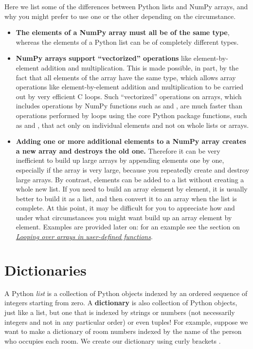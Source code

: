 \documentclass[letterpaper,10pt,english]{sphinxmanual}
\begin{document}
Here we list some of the differences between Python lists and NumPy arrays, and why you might prefer to use one or the other depending on the circumstance.
\begin{itemize}
\item {} 
\textbf{The elements of a NumPy array must all be of the same type}, whereas the elements of a Python list can be of completely different types.

\item {} 
\textbf{NumPy arrays support ``vectorized'' operations} like element-by-element addition and multiplication.  This is made possible, in part, by the fact that all elements of the array have the same type, which allows array operations like element-by-element addition and multiplication to be carried out by very efficient C loops.  Such ``vectorized'' operations on arrays, which includes operations by NumPy functions such as  and , are much faster than operations performed by loops using the core Python  package functions, such as  and , that act only on individual elements and not on whole lists or arrays.

\item {} 
\textbf{Adding one or more additional elements to a NumPy array creates a new array and destroys the old one.}  Therefore it can be very inefficient to build up large arrays by appending elements one by one, especially if the array is very large, because you repeatedly create and destroy large arrays.  By contrast, elements can be added to a list without creating a whole new list.  If you need to build an array element by element, it is usually better to build it as a list, and then convert it to an array when the list is complete.  At this point, it may be difficult for you to appreciate how and under what circumstances you might want build up an array element by element.  Examples are provided later on: for an example see the section on {\hyperref[chap7/chap7_funcs:loopingarrays]{\emph{Looping over arrays in user-defined functions}}}.

\end{itemize}


\section{Dictionaries}
\label{chap3/chap3_arrays:chap3dictionaries}\label{chap3/chap3_arrays:index-7}\label{chap3/chap3_arrays:dictionaries}
A Python \emph{list} is a collection of Python objects indexed by an ordered sequence of integers starting from zero.  A \textbf{dictionary} is also collection of Python objects, just like a list, but one that is indexed by strings or numbers (not necessarily integers and not in any particular order) or even tuples!  For example, suppose we want to make a dictionary of room numbers indexed by the name of the person who occupies each room.  We create our dictionary using curly brackets .
\end{document}

